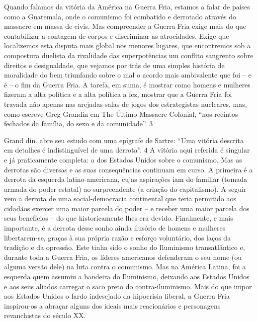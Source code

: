  
\par
 
Quando falamos da vitória da América na Guerra Fria, estamos a falar de países como a Guatemala, onde o comunismo foi combatido e derrotado através do massacre em massa de civis. Mas compreender a Guerra Fria exige mais do que contabilizar a contagem de corpos e discriminar as atrocidades. Exige que localizemos esta disputa mais global nos menores lugares, que encontremos sob a compostura duelista da rivalidade das superpotências um conflito sangrento sobre direitos e desigualdade, que vejamos por trás de uma simples história de moralidade do bem triunfando sobre o mal o acordo mais ambivalente que foi – e é – o fim da Guerra Fria. A tarefa, em suma, é mostrar como homens e mulheres fizeram a alta política e a alta política a fez, mostrar que a Guerra Fria foi travada não apenas nas arejadas salas de jogos dos estrategistas nucleares, mas, como escreve Greg Grandin em The Último Massacre Colonial, “nos recintos fechados da família, do sexo e da comunidade”.
 {\color{blue} 3}  

 
\par
 
Grand din. abre seu estudo com uma epígrafe de Sartre: “Uma vitória descrita em detalhes é indistinguível de uma derrota”.
 {\color{blue} 4}  
A vitória aqui referida é singular e já praticamente completa: a dos Estados Unidos sobre o comunismo. Mas as derrotas são diversas e as suas consequências continuam em curso. A primeira é a derrota da esquerda latino-americana, cujas aspirações iam do familiar (tomada armada do poder estatal) ao surpreendente (a criação do capitalismo). A seguir vem a derrota de uma social-democracia continental que teria permitido aos cidadãos exercer uma maior parcela do poder – e receber uma maior parcela dos seus benefícios – do que historicamente lhes era devido. Finalmente, e mais importante, é a derrota desse sonho ainda ilusório de homens e mulheres libertarem-se, graças à sua própria razão e esforço voluntário, dos laços da tradição e da opressão. Este tinha sido o sonho do Iluminismo transatlântico e, durante toda a Guerra Fria, os líderes americanos defenderam o seu nome (ou alguma versão dele) na luta contra o comunismo. Mas na América Latina, foi a esquerda quem assumiu a bandeira do Iluminismo, deixando aos Estados Unidos e aos seus aliados carregar o saco preto do contra-iluminismo. Mais do que impor aos Estados Unidos o fardo indesejado da hipocrisia liberal, a Guerra Fria inspirou-os a abraçar alguns dos ideais mais reacionários e personagens revanchistas do século XX.
 
